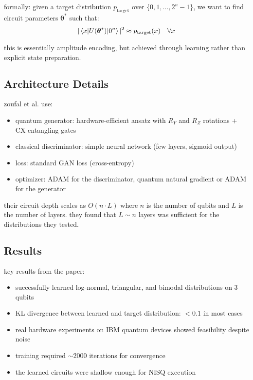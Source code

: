 \documentclass[11pt,a4paper]{article}
\theoremstyle{definition}
\theoremstyle{remark}
\begin{document}
formally: given a target distribution $p_{\text{target}}$ over $\{0, 1, \ldots, 2^n - 1\}$, we want to find circuit parameters $\boldsymbol{\theta}^*$ such that:
\[
|\braket{x | U(\boldsymbol{\theta}^*) | 0^n}|^2 \approx p_{\text{target}}(x) \quad \forall x
\]

this is essentially amplitude encoding, but achieved through learning rather than explicit state preparation.

\subsection{Architecture Details}

zoufal et al. use:
\begin{itemize}[nosep]
    \item quantum generator: hardware-efficient ansatz with $R_Y$ and $R_Z$ rotations + CX entangling gates
    \item classical discriminator: simple neural network (few layers, sigmoid output)
    \item loss: standard GAN loss (cross-entropy)
    \item optimizer: ADAM for the discriminator, quantum natural gradient or ADAM for the generator
\end{itemize}

their circuit depth scales as $O(n \cdot L)$ where $n$ is the number of qubits and $L$ is the number of layers. they found that $L \sim n$ layers was sufficient for the distributions they tested.

\subsection{Results}

key results from the paper:
\begin{itemize}[nosep]
    \item successfully learned log-normal, triangular, and bimodal distributions on 3 qubits
    \item KL divergence between learned and target distribution: $< 0.1$ in most cases
    \item real hardware experiments on IBM quantum devices showed feasibility despite noise
    \item training required $\sim 2000$ iterations for convergence
    \item the learned circuits were shallow enough for NISQ execution
\end{itemize}
\end{document}
